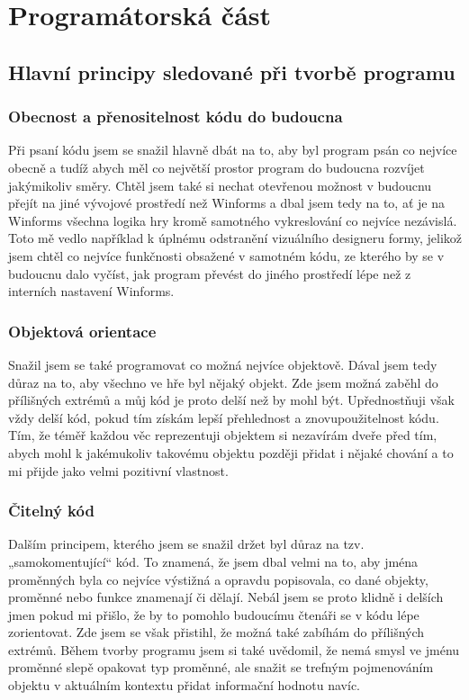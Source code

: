 \documentclass[a4]{article}
\begin{document}
\section{Programátorská část}
\subsection{Hlavní principy sledované při tvorbě programu}
\subsubsection{Obecnost a přenositelnost kódu do budoucna}
Při psaní kódu jsem se snažil hlavně dbát na to, aby byl program psán co nejvíce obecně a tudíž abych měl co největší prostor program do budoucna rozvíjet jakýmikoliv směry. Chtěl jsem také si nechat otevřenou možnost v budoucnu přejít na jiné vývojové prostředí než Winforms a dbal jsem tedy na to, ať je na Winforms všechna logika hry kromě samotného vykreslování co nejvíce nezávislá. Toto mě vedlo například k úplnému odstranění vizuálního designeru formy, jelikož jsem chtěl co nejvíce funkčnosti obsažené v samotném kódu, ze kterého by se v budoucnu dalo vyčíst, jak program převést do jiného prostředí lépe než z interních nastavení Winforms.
\subsubsection{Objektová orientace}
Snažil jsem se také programovat co možná nejvíce objektově. Dával jsem tedy důraz na to, aby všechno ve hře byl nějaký objekt. Zde jsem možná zaběhl do přílišných extrémů a můj kód je proto delší než by mohl být. Upřednostňuji však vždy delší kód, pokud tím získám lepší přehlednost a znovupoužitelnost kódu. Tím, že téměř každou věc reprezentuji objektem si nezavírám dveře před tím, abych mohl k jakémukoliv takovému objektu později přidat i nějaké chování a to mi přijde jako velmi pozitivní vlastnost.
\subsubsection{Čitelný kód}
Dalším principem, kterého jsem se snažil držet byl důraz na tzv. „samokomentující“ kód. To znamená, že jsem dbal velmi na to, aby jména proměnných byla co nejvíce výstižná a opravdu popisovala, co dané objekty, proměnné nebo funkce znamenají či dělají. Nebál jsem se proto klidně i delších jmen pokud mi přišlo, že by to pomohlo budoucímu čtenáři se v kódu lépe zorientovat. Zde jsem se však přistihl, že možná také zabíhám do přílišných extrémů. Během tvorby programu jsem si také uvědomil, že nemá smysl ve jménu proměnné slepě opakovat typ proměnné, ale snažit se trefným pojmenováním objektu v aktuálním kontextu přidat informační hodnotu navíc.
\end{document}
